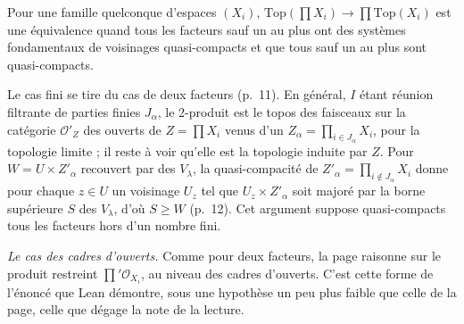 \begin{encadre}
\begin{theoreme*}\nonverifie
Pour une famille quelconque d'espaces $(X_i)$, $\mathrm{Top}(\prod X_i) \to \prod \mathrm{Top}(X_i)$ est une équivalence quand tous les facteurs sauf un au plus ont des systèmes fondamentaux de voisinages quasi-compacts et que tous sauf un au plus sont quasi-compacts.
\end{theoreme*}
\end{encadre}
\begin{demopage}[pages 11 et 12]
Le cas fini se tire du cas de deux facteurs (p.~11). En général, $I$ étant réunion filtrante de parties finies $J_\alpha$, le 2-produit est le topos des faisceaux sur la catégorie $\mathcal O'_Z$ des ouverts de $Z = \prod X_i$ venus d'un $Z_\alpha = \prod_{i \in J_\alpha} X_i$, pour la topologie limite ; il reste à voir qu'elle est la topologie induite par $Z$. Pour $W = U \times Z'_\alpha$ recouvert par des $V_\lambda$, la quasi-compacité de $Z'_\alpha = \prod_{i \notin J_\alpha} X_i$ donne pour chaque $z \in U$ un voisinage $U_z$ tel que $U_z \times Z'_\alpha$ soit majoré par la borne supérieure $S$ des $V_\lambda$, d'où $S \geq W$ (p.~12). Cet argument suppose quasi-compacts tous les facteurs hors d'un nombre fini.
\end{demopage}

\noindent\emph{Le cas des cadres d'ouverts.} Comme pour deux facteurs, la page raisonne sur le produit restreint $\prod' \mathcal O_{X_i}$, au niveau des cadres d'ouverts. C'est cette forme de l'énoncé que Lean démontre, sous une hypothèse un peu plus faible que celle de la page, celle que dégage la note de la lecture.

